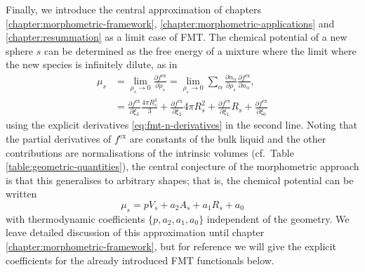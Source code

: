 Finally, we introduce the central approximation of chapters \ref{chapter:morphometric-framework}, \ref{chapter:morphometric-applications} and \ref{chapter:resummation} as a limit case of FMT.
The chemical potential of a new sphere $s$ can be determined as the free energy of a mixture where the limit where the new species is infinitely dilute, as in
\begin{equation}\label{eq:fmt-morphometric}
  \begin{split}
    \mu_s
    &=
    \lim_{\rho_s \to 0} \frac{\partial f^\mathrm{ex}}{\partial \rho_s}
    =
    \lim_{\rho_s \to 0}
    \sum_\alpha
    \frac{\partial n_\alpha}{\partial \rho_s}
    \frac{\partial f^\mathrm{ex}}{\partial n_\alpha},
    \\ &=
    \frac{\partial f^\mathrm{ex}}{\partial \xi_3} \frac{4 \pi R_s^3}{3}
    + \frac{\partial f^\mathrm{ex}}{\partial \xi_2} 4 \pi R_s^2
    + \frac{\partial f^\mathrm{ex}}{\partial \xi_1} R_s
    + \frac{\partial f^\mathrm{ex}}{\partial \xi_0}
  \end{split}
\end{equation}
using the explicit derivatives \eqref{eq:fmt-n-derivatives} in the second line.
Noting that the partial derivatives of $f^\mathrm{ex}$ are constants of the bulk liquid and the other contributions are normalisations of the intrinsic volumes (cf.\ Table \ref{table:geometric-quantities}), the central conjecture of the morphometric approach is that this generalises to arbitrary shapes; that is, the chemical potential can be written \cite{KonigPRL2004,RothPRL2006}
\begin{equation}\label{eq:fmt-morphometric-2}
  \mu_s = p V_s + a_2 A_s + a_1 R_s + a_0
\end{equation}
with thermodynamic coefficients $\{p, a_2, a_1, a_0\}$ independent of the geometry.
We leave detailed discussion of this approximation until chapter \ref{chapter:morphometric-framework}, but for reference we will give the explicit coefficients for the already introduced FMT functionals below.

